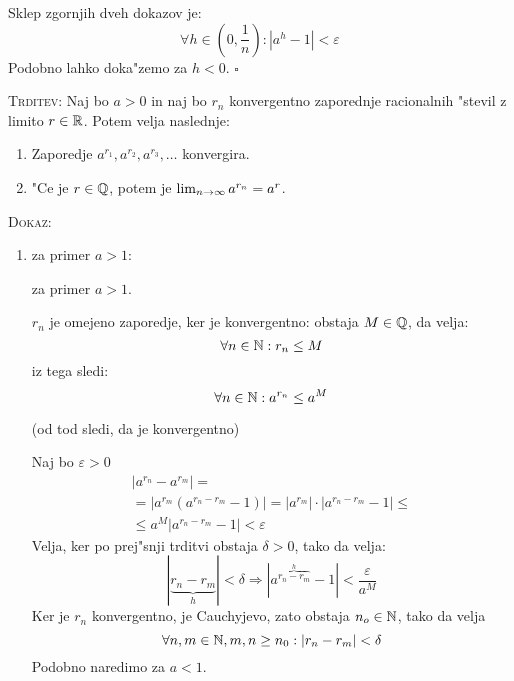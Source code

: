 Sklep zgornjih dveh dokazov je:
\begin{equation*}
\forall h \in \left(0, \frac{1}{n}\right): |a^h - 1| < \varepsilon
\end{equation*}
Podobno lahko doka"zemo za $h < 0$. \hfill $\square$

\textsc{Trditev:} Naj bo $a > 0$ in naj bo $r_n$ konvergentno zaporednje racionalnih "stevil z limito $r \in \mathbb{R}$. Potem velja naslednje:
\begin{enumerate}[(1)]
	\item Zaporedje $a^{r_1}, a^{r_2}, a^{r_3}, \ldots$	konvergira.
	\item "Ce je $r \in \mathbb{Q}$, potem je $\lim_{n \rightarrow \infty} a^{r_n} = a^r$.
\end{enumerate}

\textsc{Dokaz:}
\begin{enumerate}[(1)]
	\item za primer $a > 1$:
	
	 za primer $a > 1$.
	
	$r_n$ je omejeno zaporedje, ker je konvergentno: obstaja $M \in \mathbb{Q}$, da velja:
	\begin{equation*}
	\forall n \in \mathbb{N}: r_n \leq M
	\end{equation*}
	iz tega sledi:
	\begin{equation*}
	\forall n \in \mathbb{N}: a^{r_n} \leq a^M
	\end{equation*}
	
	 (od tod sledi, da je konvergentno)
	
	Naj bo $\varepsilon > 0$
	\begin{multline*}
		|a^{r_n} - a^{r_m}| = \\
		 = |a^{r_m}(a^{r_n - r_m} - 1)| = |a^{r_m}| \cdot |a^{r_n - r_m} - 1| \leq\\
		  \leq a^M |a^{r_n - r_m} - 1| < \varepsilon
	\end{multline*}
	Velja, ker po prej"snji trditvi obstaja $\delta > 0$, tako da velja:
	\begin{equation*}
		|\underbrace{r_n - r_m}_{h}| < \delta \Rightarrow |a^{\overbrace{r_n - r_m}^h} - 1| < \dfrac{\varepsilon}{a^M}
	\end{equation*}
	Ker je $r_n$ konvergentno, je Cauchyjevo, zato obstaja $n_o \in \mathbb{N}$, tako da velja
	\begin{equation*}
	 \forall n, m \in \mathbb{N}, m, n \geq n_0: |r_n - r_m|  < \delta
	\end{equation*}
	Podobno naredimo za $a < 1$.
	

\end{enumerate}
